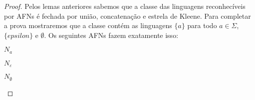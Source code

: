 \begin{proof}
  Pelos lemas anteriores sabemos que a classe das linguagens reconhecíveis por AFNs é fechada por união, concatenação e estrela de Kleene.
  Para completar a prova mostraremos que a classe contém as linguagens $\{a\}$ para todo $a \in \Sigma$, $\{epsilon\}$ e $\emptyset$.
Os seguintes AFNs fazem exatamente isso:

$N_a$

\begin{center}
\end{center}

$N_\varepsilon$
\begin{center}
\end{center}

$N_\emptyset$
\begin{center}
\end{center}
\end{proof}


